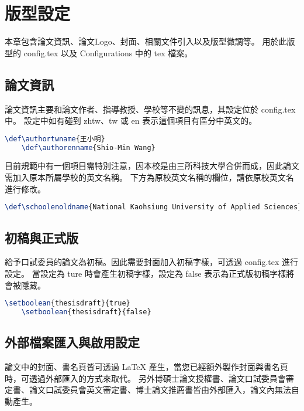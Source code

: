 \chapter{版型設定} \label{ch_tmp_config}

本章包含論文資訊、論文Logo、封面、相關文件引入以及版型微調等。
用於此版型的 config.tex 以及 Configurations 中的 tex 檔案。

\section{論文資訊}

論文資訊主要和論文作者、指導教授、學校等不變的訊息，其設定位於 config.tex 中。
設定中如有碰到 zhtw、tw 或 en 表示這個項目有區分中英文的。

\begin{lstlisting}[language=TeX]
    \def\authortwname{王小明}
    \def\authorenname{Shio-Min Wang}
\end{lstlisting}

目前規範中有一個項目需特別注意，因本校是由三所科技大學合併而成，因此論文需加入原本所屬學校的英文名稱。
下方為原校英文名稱的欄位，請依原校英文名進行修改。

\begin{lstlisting}[language=TeX]
    \def\schoolenoldname{National Kaohsiung University of Applied Sciences}
\end{lstlisting}

\section{初稿與正式版}

給予口試委員的論文為初稿。因此需要封面加入初稿字樣，可透過 config.tex 進行設定。
當設定為 ture 時會產生初稿字樣，設定為 false 表示為正式版初稿字樣將會被隱藏。

\begin{lstlisting}[language=TeX]
    \setboolean{thesisdraft}{true}
    \setboolean{thesisdraft}{false}
\end{lstlisting}

\section{外部檔案匯入與啟用設定}

論文中的封面、書名頁皆可透過 LaTeX 產生，當您已經額外製作封面與書名頁時，可透過外部匯入的方式來取代。
另外博碩士論文授權書、論文口試委員會審定書、論文口試委員會英文審定書、博士論文推薦書皆由外部匯入，論文內無法自動產生。

